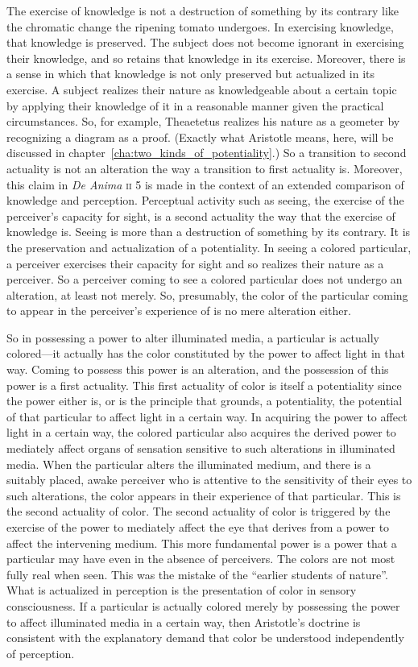 The exercise of knowledge is not a destruction of something by its contrary like the chromatic change the ripening tomato undergoes. In exercising knowledge, that knowledge is preserved. The subject does not become ignorant in exercising their knowledge, and so retains that knowledge in its exercise. Moreover, there is a sense in which that knowledge is not only preserved but actualized in its exercise. A subject realizes their nature as knowledgeable about a certain topic by applying their knowledge of it in a reasonable manner given the practical circumstances. So, for example, Theaetetus realizes his nature as a geometer by recognizing a diagram as a proof. (Exactly what Aristotle means, here, will be discussed in chapter~\ref{cha:two_kinds_of_potentiality}.) So a transition to second actuality is not an alteration the way a transition to first actuality is. Moreover, this claim in \emph{De Anima} \textsc{ii} 5 is made in the context of an extended comparison of knowledge and perception. Perceptual activity such as seeing, the exercise of the perceiver's capacity for sight, is a second actuality the way that the exercise of knowledge is. Seeing is more than a destruction of something by its contrary. It is the preservation and actualization of a potentiality. In seeing a colored particular, a perceiver exercises their capacity for sight and so realizes their nature as a perceiver. So a perceiver coming to see a colored particular does not undergo an alteration, at least not merely. So, presumably, the color of the particular coming to appear in the perceiver's experience of is no mere alteration either. 

So in possessing a power to alter illuminated media, a particular is actually colored---it actually has the color constituted by the power to affect light in that way. Coming to possess this power is an alteration, and the possession of this power is a first actuality. This first actuality of color is itself a potentiality since the power either is, or is the principle that grounds, a potentiality, the potential of that particular to affect light in a certain way. In acquiring the power to affect light in a certain way, the colored particular also acquires the derived power to mediately affect organs of sensation sensitive to such alterations in illuminated media. When the particular alters the illuminated medium, and there is a suitably placed, awake perceiver who is attentive to the sensitivity of their eyes to such alterations, the color appears in their experience of that particular. This is the second actuality of color. The second actuality of color is triggered by the exercise of the power to mediately affect the eye that derives from a power to affect the intervening medium. This more fundamental power is a power that a particular may have even in the absence of perceivers. The colors are not most fully real when seen. This was the mistake of the ``earlier students of nature''. What is actualized in perception is the presentation of color in sensory consciousness. If a particular is actually colored merely by possessing the power to affect illuminated media in a certain way, then Aristotle's doctrine is consistent with the explanatory demand that color be understood independently of perception.

